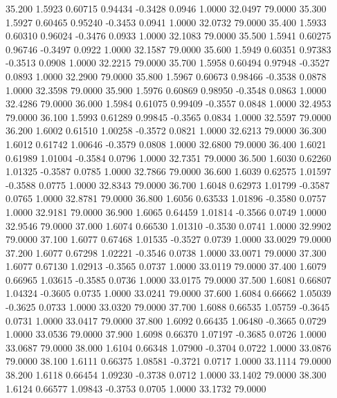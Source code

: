   35.200   1.5923   0.60715   0.94434  -0.3428   0.0946   1.0000  32.0497  79.0000
  35.300   1.5927   0.60465   0.95240  -0.3453   0.0941   1.0000  32.0732  79.0000
  35.400   1.5933   0.60310   0.96024  -0.3476   0.0933   1.0000  32.1083  79.0000
  35.500   1.5941   0.60275   0.96746  -0.3497   0.0922   1.0000  32.1587  79.0000
  35.600   1.5949   0.60351   0.97383  -0.3513   0.0908   1.0000  32.2215  79.0000
  35.700   1.5958   0.60494   0.97948  -0.3527   0.0893   1.0000  32.2900  79.0000
  35.800   1.5967   0.60673   0.98466  -0.3538   0.0878   1.0000  32.3598  79.0000
  35.900   1.5976   0.60869   0.98950  -0.3548   0.0863   1.0000  32.4286  79.0000
  36.000   1.5984   0.61075   0.99409  -0.3557   0.0848   1.0000  32.4953  79.0000
  36.100   1.5993   0.61289   0.99845  -0.3565   0.0834   1.0000  32.5597  79.0000
  36.200   1.6002   0.61510   1.00258  -0.3572   0.0821   1.0000  32.6213  79.0000
  36.300   1.6012   0.61742   1.00646  -0.3579   0.0808   1.0000  32.6800  79.0000
  36.400   1.6021   0.61989   1.01004  -0.3584   0.0796   1.0000  32.7351  79.0000
  36.500   1.6030   0.62260   1.01325  -0.3587   0.0785   1.0000  32.7866  79.0000
  36.600   1.6039   0.62575   1.01597  -0.3588   0.0775   1.0000  32.8343  79.0000
  36.700   1.6048   0.62973   1.01799  -0.3587   0.0765   1.0000  32.8781  79.0000
  36.800   1.6056   0.63533   1.01896  -0.3580   0.0757   1.0000  32.9181  79.0000
  36.900   1.6065   0.64459   1.01814  -0.3566   0.0749   1.0000  32.9546  79.0000
  37.000   1.6074   0.66530   1.01310  -0.3530   0.0741   1.0000  32.9902  79.0000
  37.100   1.6077   0.67468   1.01535  -0.3527   0.0739   1.0000  33.0029  79.0000
  37.200   1.6077   0.67298   1.02221  -0.3546   0.0738   1.0000  33.0071  79.0000
  37.300   1.6077   0.67130   1.02913  -0.3565   0.0737   1.0000  33.0119  79.0000
  37.400   1.6079   0.66965   1.03615  -0.3585   0.0736   1.0000  33.0175  79.0000
  37.500   1.6081   0.66807   1.04324  -0.3605   0.0735   1.0000  33.0241  79.0000
  37.600   1.6084   0.66662   1.05039  -0.3625   0.0733   1.0000  33.0320  79.0000
  37.700   1.6088   0.66535   1.05759  -0.3645   0.0731   1.0000  33.0417  79.0000
  37.800   1.6092   0.66435   1.06480  -0.3665   0.0729   1.0000  33.0536  79.0000
  37.900   1.6098   0.66370   1.07197  -0.3685   0.0726   1.0000  33.0687  79.0000
  38.000   1.6104   0.66348   1.07900  -0.3704   0.0722   1.0000  33.0876  79.0000
  38.100   1.6111   0.66375   1.08581  -0.3721   0.0717   1.0000  33.1114  79.0000
  38.200   1.6118   0.66454   1.09230  -0.3738   0.0712   1.0000  33.1402  79.0000
  38.300   1.6124   0.66577   1.09843  -0.3753   0.0705   1.0000  33.1732  79.0000
